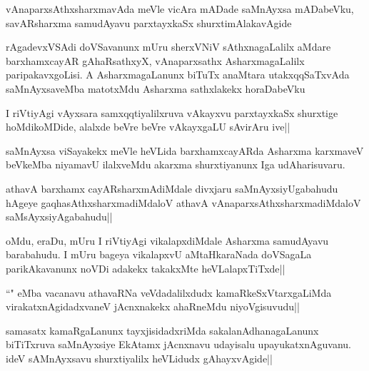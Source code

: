 \begin{artha}
vAnaparxsAthxsharxmavAda meVle vicAra mADade saMnAyxsa mADabeVku, savARsharxma samudAyavu parxtayxkaSx shurxtimAlakavAgide
\end{artha}


\begin{artha}
rAgadevxVSAdi doVSavanunx mUru sherxVNiV sAthxnagaLalilx aMdare barxhamxcayAR gAhaRsathxyX, vAnaparxsathx AsharxmagaLalilx paripakavxgoLisi. A AsharxmagaLanunx biTuTx anaMtara utakxqqSaTxvAda saMnAyxsaveMba matotxMdu Asharxma sathxlakekx horaDabeVku
\end{artha}

\begin{artha}%
I riVtiyAgi vAyxsara samxqqtiyalilxruva vAkayxvu parxtayxkaSx shurxtige hoMdikoMDide, alalxde beVre beVre vAkayxgaLU sAvirAru ive||

saMnAyxsa viSayakekx meVle heVLida barxhamxcayARda Asharxma karxmaveV beVkeMba niyamavU ilalxveMdu akarxma shurxtiyanunx Iga udAharisuvaru.
\end{artha}

\begin{artha}
athavA barxhamx cayARsharxmAdiMdale divxjaru saMnAyxsiyUgabahudu hAgeye gaqhasAthxsharxmadiMdaloV athavA vAnaparxsAthxsharxmadiMdaloV saMsAyxsiyAgabahudu||
\end{artha}

\begin{artha}
oMdu, eraDu, mUru I riVtiyAgi vikalapxdiMdale Asharxma samudAyavu barabahudu. I mUru bageya vikalapxvU aMtaHkaraNada doVSagaLa parikAkavanunx noVDi adakekx takakxMte heVLalapxTiTxde||
\end{artha}

\begin{artha}
``\stext " eMba vacanavu athavaRNa veVdadalilxdudx kamaRkeSxVtarxgaLiMda virakatxnAgidadxvaneV jAcnxnakekx ahaRneMdu niyoVgisuvudu||
\end{artha}


\begin{artha}
samasatx kamaRgaLanunx tayxjisidadxriMda sakalanAdhanagaLanunx biTiTxruva saMnAyxsiye EkAtamx jAcnxnavu udayisalu upayukatxnAguvanu. ideV sAMnAyxsavu shurxtiyalilx heVLidudx gAhayxvAgide||
\end{artha}

